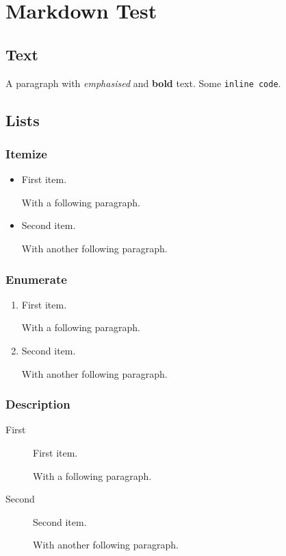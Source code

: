 \documentclass[
  text,
  markdown,
  basic maths
]{internet}
\begin{document}
\section{Markdown Test}

\subsection{Text}

A paragraph with \emph{emphasised} and \textbf{bold} text.
Some \verb+inline code+.

\subsection{Lists}

\subsubsection{Itemize}

\begin{itemize}
\item First item.

With a following paragraph.

\item Second item.

With another following paragraph.
\end{itemize}

\subsubsection{Enumerate}

\begin{enumerate}
\item First item.

With a following paragraph.

\item Second item.

With another following paragraph.
\end{enumerate}

\subsubsection{Description}

\begin{description}
\item[First] First item.

With a following paragraph.

\item[Second] Second item.

With another following paragraph.
\end{description}
\end{document}
